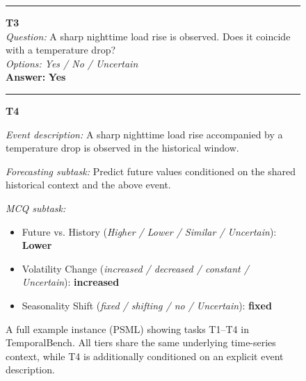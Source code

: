 \begin{figure}[htbp]
\begin{tcolorbox}[
  colback=gray!6,
  colframe=black!20,
  boxrule=0.5pt,
  arc=3pt,
  left=6pt,right=6pt,top=6pt,bottom=6pt
]
\vspace{3pt}\hrule\vspace{4pt}

\textbf{T3} \\
\emph{Question:} A sharp nighttime load rise is observed. Does it coincide with a temperature drop? \\
\emph{Options:} \textit{Yes / No / Uncertain} \\
\textbf{Answer:} \textbf{Yes}

\vspace{3pt}\hrule\vspace{4pt}

\textbf{T4}

\emph{Event description:}
A sharp nighttime load rise accompanied by a temperature drop is observed in the historical window.

\emph{Forecasting subtask:}
Predict future values conditioned on the shared historical context and the above event.

\emph{MCQ subtask:}
\begin{itemize}[leftmargin=1.1em,itemsep=0pt,topsep=0pt,parsep=0pt,partopsep=0pt]
  \item Future vs. History
  (\textit{Higher / Lower / Similar / Uncertain}): \textbf{Lower}
  \item Volatility Change
  (\textit{increased / decreased / constant / Uncertain}): \textbf{increased}
  \item Seasonality Shift
  (\textit{fixed / shifting / no / Uncertain}): \textbf{fixed}
\end{itemize}

\end{tcolorbox}
\caption{A full example instance (PSML) showing tasks T1--T4 in TemporalBench. All tiers share the same underlying time-series context, while T4 is additionally conditioned on an explicit event description.}
\label{fig:appendix_psml_one_example}
\end{figure}


